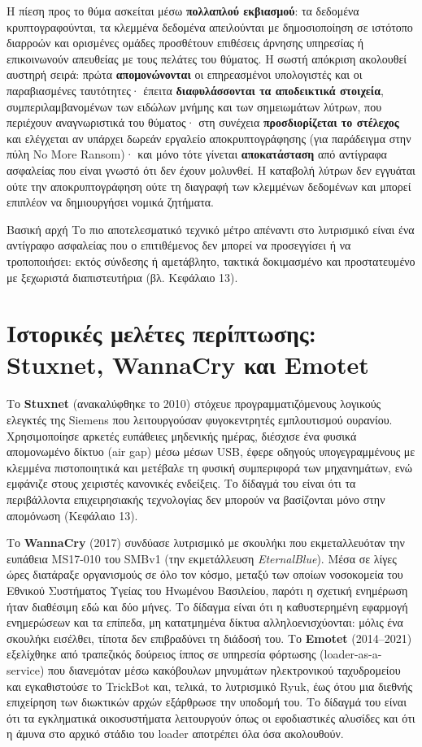 \documentclass[11pt,openany]{book}
\begin{document}
Η πίεση προς το θύμα ασκείται μέσω \textbf{πολλαπλού εκβιασμού}: τα δεδομένα κρυπτογραφούνται, τα κλεμμένα δεδομένα απειλούνται με δημοσιοποίηση σε ιστότοπο διαρροών και ορισμένες ομάδες προσθέτουν επιθέσεις άρνησης υπηρεσίας ή επικοινωνούν απευθείας με τους πελάτες του θύματος. Η σωστή απόκριση ακολουθεί αυστηρή σειρά: πρώτα \textbf{απομονώνονται} οι επηρεασμένοι υπολογιστές και οι παραβιασμένες ταυτότητες· έπειτα \textbf{διαφυλάσσονται τα αποδεικτικά στοιχεία}, συμπεριλαμβανομένων των ειδώλων μνήμης και των σημειωμάτων λύτρων, που περιέχουν αναγνωριστικά του θύματος· στη συνέχεια \textbf{προσδιορίζεται το στέλεχος} και ελέγχεται αν υπάρχει δωρεάν εργαλείο αποκρυπτογράφησης (για παράδειγμα στην πύλη No More Ransom)· και μόνο τότε γίνεται \textbf{αποκατάσταση} από αντίγραφα ασφαλείας που είναι γνωστό ότι δεν έχουν μολυνθεί. Η καταβολή λύτρων δεν εγγυάται ούτε την αποκρυπτογράφηση ούτε τη διαγραφή των κλεμμένων δεδομένων και μπορεί επιπλέον να δημιουργήσει νομικά ζητήματα.

\begin{keybox}{Βασική αρχή}
Το πιο αποτελεσματικό τεχνικό μέτρο απέναντι στο λυτρισμικό είναι ένα αντίγραφο ασφαλείας που ο επιτιθέμενος δεν μπορεί να προσεγγίσει ή να τροποποιήσει: εκτός σύνδεσης ή αμετάβλητο, τακτικά δοκιμασμένο και προστατευμένο με ξεχωριστά διαπιστευτήρια (βλ. Κεφάλαιο 13).
\end{keybox}

\section{Ιστορικές μελέτες περίπτωσης: Stuxnet, WannaCry και Emotet}\label{sec:4.6}
Το \textbf{Stuxnet} (ανακαλύφθηκε το 2010) στόχευε προγραμματιζόμενους λογικούς ελεγκτές της Siemens που λειτουργούσαν φυγοκεντρητές εμπλουτισμού ουρανίου. Χρησιμοποίησε αρκετές ευπάθειες μηδενικής ημέρας, διέσχισε ένα φυσικά απομονωμένο δίκτυο (air gap) μέσω μέσων USB, έφερε οδηγούς υπογεγραμμένους με κλεμμένα πιστοποιητικά και μετέβαλε τη φυσική συμπεριφορά των μηχανημάτων, ενώ εμφάνιζε στους χειριστές κανονικές ενδείξεις. Το δίδαγμά του είναι ότι τα περιβάλλοντα επιχειρησιακής τεχνολογίας δεν μπορούν να βασίζονται μόνο στην απομόνωση (Κεφάλαιο 13).

Το \textbf{WannaCry} (2017) συνδύασε λυτρισμικό με σκουλήκι που εκμεταλλευόταν την ευπάθεια MS17-010 του SMBv1 (την εκμετάλλευση \emph{EternalBlue}). Μέσα σε λίγες ώρες διατάραξε οργανισμούς σε όλο τον κόσμο, μεταξύ των οποίων νοσοκομεία του Εθνικού Συστήματος Υγείας του Ηνωμένου Βασιλείου, παρότι η σχετική ενημέρωση ήταν διαθέσιμη εδώ και δύο μήνες. Το δίδαγμα είναι ότι η καθυστερημένη εφαρμογή ενημερώσεων και τα επίπεδα, μη κατατμημένα δίκτυα αλληλοενισχύονται: μόλις ένα σκουλήκι εισέλθει, τίποτα δεν επιβραδύνει τη διάδοσή του. Το \textbf{Emotet} (2014–2021) εξελίχθηκε από τραπεζικός δούρειος ίππος σε υπηρεσία φόρτωσης (loader-as-a-service) που διανεμόταν μέσω κακόβουλων μηνυμάτων ηλεκτρονικού ταχυδρομείου και εγκαθιστούσε το TrickBot και, τελικά, το λυτρισμικό Ryuk, έως ότου μια διεθνής επιχείρηση των διωκτικών αρχών εξάρθρωσε την υποδομή του. Το δίδαγμά του είναι ότι τα εγκληματικά οικοσυστήματα λειτουργούν όπως οι εφοδιαστικές αλυσίδες και ότι η άμυνα στο αρχικό στάδιο του loader αποτρέπει όλα όσα ακολουθούν.
\end{document}
